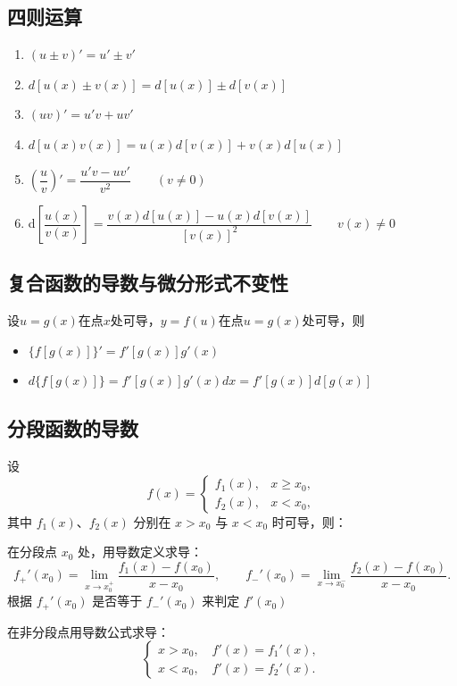 \documentclass[a4paper,12pt]{article}
\begin{document}
    \subsection{四则运算}

    \begin{enumerate}
        \item $(u \pm v)' = u' \pm v'$
        \item $d[u(x) \pm v(x)] = d[u(x)] \pm d[v(x)]$

        \item $(uv)' = u'v + uv'$
        \item $d[u(x)v(x)] = u(x)d[v(x)] + v(x)d[u(x)]$

        \item $\left(\dfrac{u}{v}\right)'
        = \dfrac{u'v - uv'}{v^2}\qquad (v \neq 0)$
        \item d$\left[\dfrac{u(x)}{v(x)}\right]
        = \dfrac{v(x)d[u(x)] - u(x)d[v(x)]}{[v(x)]^2}\qquad v(x) \neq 0$
    \end{enumerate}

    \subsection{复合函数的导数与微分形式不变性}

    设$u = g(x)$在点$x$处可导，$y = f(u)$在点$u = g(x)$处可导，则
    \begin{itemize}
        \item $\{f[g(x)]\}' = f'[g(x)]g'(x)$
        \item $d\{f[g(x)]\} = f'[g(x)]g'(x)dx = f'[g(x)]d[g(x)]$
    \end{itemize}

    \subsection{分段函数的导数}

    设
    \[
        f(x)=
        \begin{cases}
            f_1(x), & x \ge x_0,\\
            f_2(x), & x < x_0,
        \end{cases}
    \]
    其中 $f_1(x)$、$f_2(x)$ 分别在 $x>x_0$ 与 $x<x_0$ 时可导，则：

    \begin{circlenum}
        \item 在分段点 $x_0$ 处，用导数定义求导：
        \[
            f_+'(x_0)=\lim_{x\to x_0^+}\frac{f_1(x)-f(x_0)}{x-x_0},\qquad
            f_-'(x_0)=\lim_{x\to x_0^-}\frac{f_2(x)-f(x_0)}{x-x_0}.
        \]
        根据 $f_+'(x_0)$ 是否等于 $f_-'(x_0)$ 来判定 $f'(x_0)$

        \item 在非分段点用导数公式求导：
        \[
            \begin{cases}
                x>x_0,\quad f'(x)=f_1'(x),\\
                x<x_0,\quad f'(x)=f_2'(x).
            \end{cases}
        \]
    \end{circlenum}
\end{document}
